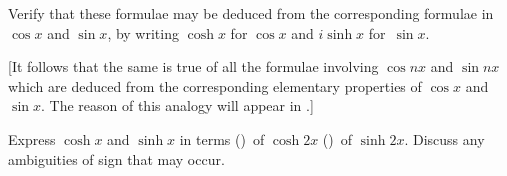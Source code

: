 Verify that these formulae may be deduced from the corresponding
formulae in $\cos x$ and $\sin x$, by writing $\cosh x$ for $\cos x$ and $i\sinh x$ for~$\sin x$.

[It follows that the same is true of all the formulae involving $\cos nx$ and
$\sin nx$ which are deduced from the corresponding elementary properties of
$\cos x$ and~$\sin x$. The reason of this analogy will appear in \@.]

 Express $\cosh x$ and $\sinh x$ in terms (\ia)~of $\cosh 2x$ (\ib)~of $\sinh 2x$.
Discuss any ambiguities of sign that may occur. 

